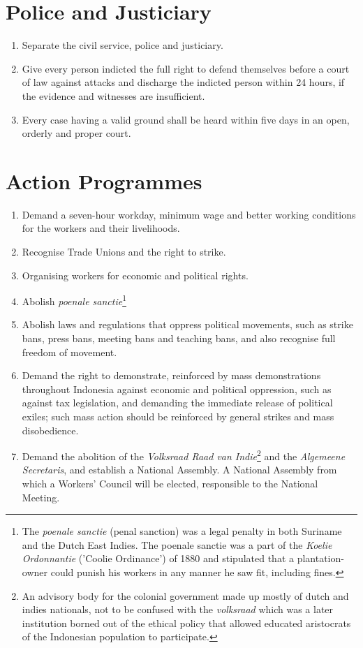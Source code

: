 \section{Police and Justiciary}

\begin{enumerate}
    \item Separate the civil service, police and justiciary.
    \item Give every person indicted the full right to defend themselves before a court of law against attacks and discharge the indicted person within 24 hours, if the evidence and witnesses are insufficient.
    \item Every case having a valid ground shall be heard within five days in an open, orderly and proper court.
\end{enumerate}

\section{Action Programmes}

\begin{enumerate}
    \item Demand a seven-hour workday, minimum wage and better working conditions for the workers and their livelihoods.
    \item Recognise Trade Unions and the right to strike.
    \item Organising workers for economic and political rights.
    \item Abolish \emph{poenale sanctie}\footnote[10]{The \emph{poenale sanctie} (penal sanction) was a legal penalty in both Suriname and the Dutch East Indies. The poenale sanctie was a part of the \emph{Koelie Ordonnantie} ('Coolie Ordinance') of 1880 and stipulated that a plantation-owner could punish his workers in any manner he saw fit, including fines.}
    \item Abolish laws and regulations that oppress political movements, such as strike bans, press bans, meeting bans and teaching bans, and also recognise full freedom of movement.
    \item Demand the right to demonstrate, reinforced by mass demonstrations throughout Indonesia against economic and political oppression, such as against tax legislation, and demanding the immediate release of political exiles; such mass action should be reinforced by general strikes and mass disobedience.
    \item Demand the abolition of the \emph{Volksraad Raad van Indie}\footnote[11]{An advisory body for the colonial government made up mostly of dutch and indies nationals, not to be confused with the \emph{volksraad} which was a later institution borned out of the ethical policy that allowed educated aristocrats of the Indonesian population to participate.} and the \emph{Algemeene Secretaris}, and establish a National Assembly. A National Assembly from which a Workers' Council will be elected, responsible to the National Meeting.
\end{enumerate}